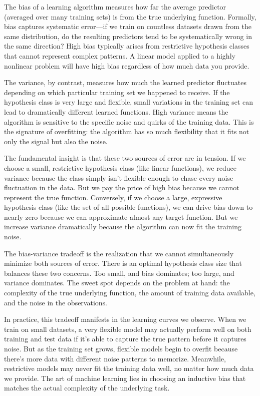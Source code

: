 The \alert{bias} of a learning algorithm measures how far the average predictor (averaged over many training sets) is from the true underlying function. Formally, bias captures systematic error---if we train on countless datasets drawn from the same distribution, do the resulting predictors tend to be systematically wrong in the same direction? High bias typically arises from restrictive hypothesis classes that cannot represent complex patterns. A linear model applied to a highly nonlinear problem will have high bias regardless of how much data you provide.

The \alert{variance}, by contrast, measures how much the learned predictor fluctuates depending on which particular training set we happened to receive. If the hypothesis class is very large and flexible, small variations in the training set can lead to dramatically different learned functions. High variance means the algorithm is sensitive to the specific noise and quirks of the training data. This is the signature of overfitting: the algorithm has so much flexibility that it fits not only the signal but also the noise.

The fundamental insight is that these two sources of error are in tension. If we choose a small, restrictive hypothesis class (like linear functions), we reduce variance because the class simply isn't flexible enough to chase every noise fluctuation in the data. But we pay the price of high bias because we cannot represent the true function. Conversely, if we choose a large, expressive hypothesis class (like the set of all possible functions), we can drive bias down to nearly zero because we can approximate almost any target function. But we increase variance dramatically because the algorithm can now fit the training noise.

The \alert{bias-variance tradeoff} is the realization that we cannot simultaneously minimize both sources of error. There is an optimal hypothesis class size that balances these two concerns. Too small, and bias dominates; too large, and variance dominates. The sweet spot depends on the problem at hand: the complexity of the true underlying function, the amount of training data available, and the noise in the observations.

In practice, this tradeoff manifests in the learning curves we observe. When we train on small datasets, a very flexible model may actually perform well on both training and test data if it's able to capture the true pattern before it captures noise. But as the training set grows, flexible models begin to overfit because there's more data with different noise patterns to memorize. Meanwhile, restrictive models may never fit the training data well, no matter how much data we provide. The art of machine learning lies in choosing an inductive bias that matches the actual complexity of the underlying task.

